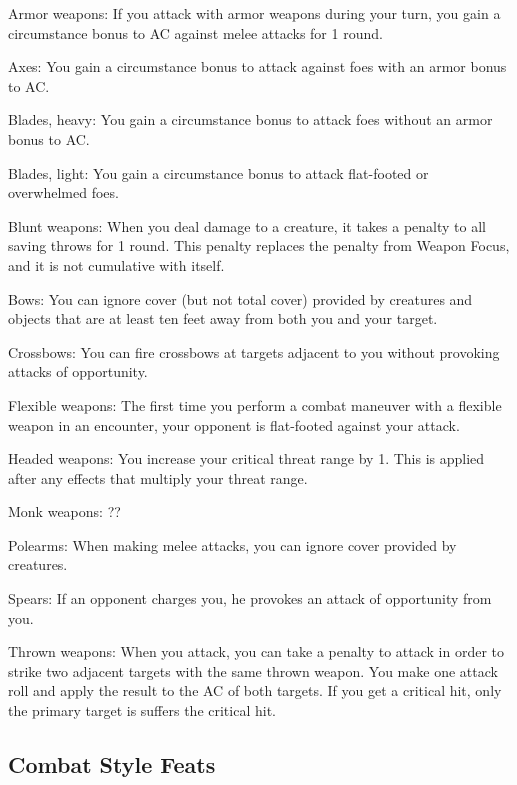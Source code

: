 \begin{itemize*}
    \item Armor weapons: If you attack with armor weapons during your turn, you gain a  circumstance bonus to AC against melee attacks for 1 round.
    \item Axes: You gain a  circumstance bonus to attack against foes with an armor bonus to AC.
    \item Blades, heavy: You gain a  circumstance bonus to attack foes without an armor bonus to AC.
    \item Blades, light: You gain a  circumstance bonus to attack flat-footed or overwhelmed foes.
    \item Blunt weapons: When you deal damage to a creature, it takes a  penalty to all saving throws for 1 round. This penalty replaces the penalty from Weapon Focus, and it is not cumulative with itself.
    \item Bows: You can ignore cover (but not total cover) provided by creatures and objects that are at least ten feet away from both you and your target.
    \item Crossbows: You can fire crossbows at targets adjacent to you without provoking attacks of opportunity.
    \item Flexible weapons: The first time you perform a combat maneuver with a flexible weapon in an encounter, your opponent is flat-footed against your attack.
    \item Headed weapons: You increase your critical threat range by 1. This is applied after any effects that multiply your threat range.
    \item Monk weapons: ??
    \item Polearms: When making melee attacks, you can ignore cover provided by creatures.
    \item Spears: If an opponent charges you, he provokes an attack of opportunity from you.
    \item Thrown weapons: When you attack, you can take a  penalty to attack in order to strike two adjacent targets with the same thrown weapon. You make one attack roll and apply the result to the AC of both targets. If you get a critical hit, only the primary target is suffers the critical hit. 
\end{itemize*}

\subsection{Combat Style Feats}

